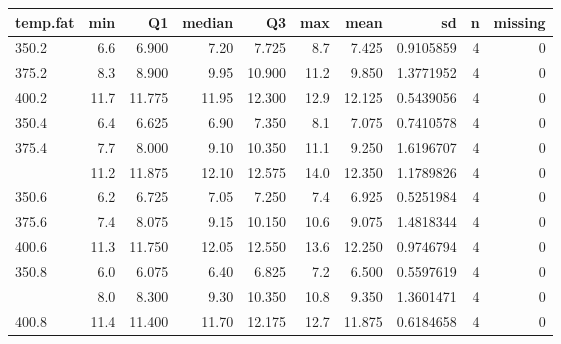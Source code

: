 \documentclass[12pt,]{article}
\begin{document}
\begin{table}[H]
\centering\begingroup\fontsize{8}{10}\selectfont

\begin{tabular}{lrrrrr>{\columncolor[HTML]{EAFAF1}}rrrr}
\toprule
temp.fat & min & Q1 & median & Q3 & max & mean & sd & n & missing\\
\midrule
350.2 & 6.6 & 6.900 & 7.20 & 7.725 & 8.7 & 7.425 & 0.9105859 & 4 & 0\\
375.2 & 8.3 & 8.900 & 9.95 & 10.900 & 11.2 & 9.850 & 1.3771952 & 4 & 0\\
400.2 & 11.7 & 11.775 & 11.95 & 12.300 & 12.9 & 12.125 & 0.5439056 & 4 & 0\\
350.4 & 6.4 & 6.625 & 6.90 & 7.350 & 8.1 & 7.075 & 0.7410578 & 4 & 0\\
375.4 & 7.7 & 8.000 & 9.10 & 10.350 & 11.1 & 9.250 & 1.6196707 & 4 & 0\\
\addlinespace
400.4 & 11.2 & 11.875 & 12.10 & 12.575 & 14.0 & 12.350 & 1.1789826 & 4 & 0\\
350.6 & 6.2 & 6.725 & 7.05 & 7.250 & 7.4 & 6.925 & 0.5251984 & 4 & 0\\
375.6 & 7.4 & 8.075 & 9.15 & 10.150 & 10.6 & 9.075 & 1.4818344 & 4 & 0\\
400.6 & 11.3 & 11.750 & 12.05 & 12.550 & 13.6 & 12.250 & 0.9746794 & 4 & 0\\
350.8 & 6.0 & 6.075 & 6.40 & 6.825 & 7.2 & 6.500 & 0.5597619 & 4 & 0\\
\addlinespace
375.8 & 8.0 & 8.300 & 9.30 & 10.350 & 10.8 & 9.350 & 1.3601471 & 4 & 0\\
400.8 & 11.4 & 11.400 & 11.70 & 12.175 & 12.7 & 11.875 & 0.6184658 & 4 & 0\\
\bottomrule
\end{tabular}
\endgroup{}
\end{table}
\end{document}
